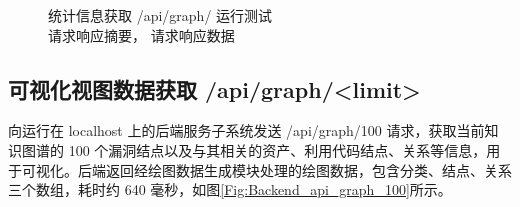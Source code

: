 \documentclass[a4paper,AutoFakeBold,oneside,12pt]{book}
\begin{document}
\begin{figure}[!htbp]
	\centering
	\quad %
	\caption{统计信息获取 /api/graph/ 运行测试\\ \protect{} 请求响应摘要，\protect{} 请求响应数据}
	\label{Fig:Backend_api_graph}
\end{figure}

\subsection{可视化视图数据获取 /api/graph/<limit>}

向运行在 localhost 上的后端服务子系统发送 /api/graph/100 请求，获取当前知识图谱的 100 个漏洞结点以及与其相关的资产、利用代码结点、关系等信息，用于可视化。后端返回经绘图数据生成模块处理的绘图数据，包含分类、结点、关系三个数组，耗时约 640 毫秒，如图\ref{Fig:Backend_api_graph_100}所示。

\end{document}
